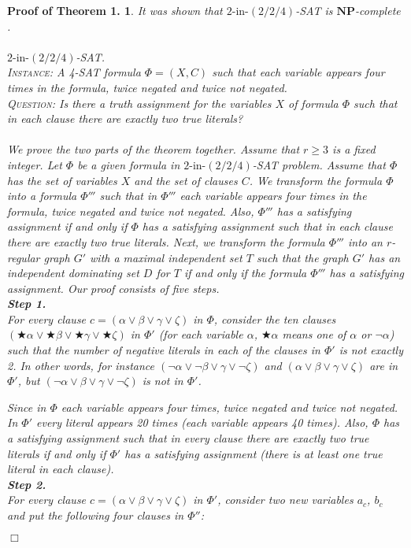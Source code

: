 \documentclass[
final
]{dmtcs-episciences}
\newtheorem{preali}{{\bf Proof of Theorem 1.}}
\newenvironment{ali}[1]{\begin{preali}{\rm
			#1}\hfill{$\Box$}}{\end{preali}}
\begin{document}
\begin{ali}{
		It was shown that $2\text{-in-}(2/2/4)$-SAT is $ \mathbf{NP}$-complete \cite{Puzzle}. 
\\ \\
{\em $2\text{-in-}(2/2/4)$-SAT.}\\
\textsc{Instance}: A 4-SAT formula $\Phi=(X,C)$ such that  each variable appears four
times in the formula, twice negated and twice not negated.\\
\textsc{Question}: Is there a truth assignment for the variables $X$ of formula $\Phi$  such that in each clause there are exactly two true
literals?
\\ \\		
We prove the two parts of the theorem together.
		Assume that $r\geq 3$ is a fixed integer. Let $\Phi$ be a given formula in $2\text{-in-}(2/2/4)$-SAT problem. Assume that $\Phi$ has  the set of variables $X$ and the set of clauses $C$.
		We transform the formula $\Phi$ into a
		formula $\Phi '''$  such that in $\Phi '''$
		each variable appears four
		times in the formula, twice negated and twice not negated. Also,
		$\Phi '''$ has a  satisfying assignment  if and only if $\Phi$ has a  satisfying assignment such that in each clause there are exactly two true literals. Next, we transform the formula $\Phi'''$ into  an  $r$-regular  graph $G' $ with a maximal independent set $T$
		such that the graph $G' $ has an independent dominating set $D$ for $T$ if and only if the formula $\Phi '''$ has a  satisfying assignment.
		Our proof consists of five steps.\\
		{{\bf Step 1.}}\\
		For every clause $c=(\alpha \vee \beta \vee \gamma \vee \zeta)$ in $\Phi$, consider the ten clauses $(\bigstar\alpha \vee \bigstar\beta \vee \bigstar\gamma \vee \bigstar\zeta)$ in $\Phi '$ (for each variable $\alpha$, $\bigstar \alpha$ means one of $\alpha$ or $\neg \alpha$) such that the number of negative literals in each of the clauses in $\Phi '$ is not exactly 2.
		In other words, for instance $(\neg \alpha \vee \neg\beta \vee \gamma \vee \neg\zeta)$ and $ (\alpha \vee \beta \vee \gamma \vee \zeta)$ are in $\Phi '$, but $(\neg \alpha \vee  \beta \vee \gamma \vee \neg\zeta)$ is not in $\Phi '$.
		
		Since in $\Phi $ each variable appears four
		times, twice negated and twice not negated. In $\Phi '$ every literal appears 20 times (each variable appears 40 times). Also, $\Phi $ has a  satisfying assignment such that in every clause there are exactly two true literals if and only if $\Phi '$ has a satisfying assignment (there is at least one true literal in each clause).\\
		{{\bf Step 2.}}\\
		For every clause $c=(\alpha \vee \beta \vee \gamma \vee \zeta)$ in $\Phi'$, consider two new variables $a_c$, $b_c$ and put the following four clauses in $\Phi ''$:
		
}
\end{ali}
\end{document}
